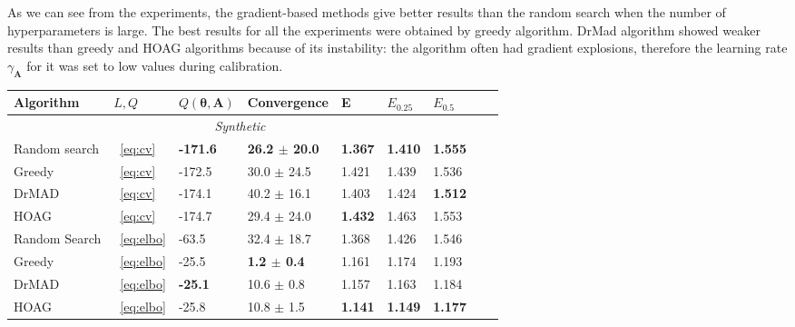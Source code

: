 \documentclass[smallextended]{svjour3}
\begin{document}
As we can see from the experiments, the gradient-based methods give better results than the random search when the number of hyperparameters is large. The best results for all the experiments were obtained by greedy algorithm. DrMad algorithm showed weaker results than greedy and HOAG algorithms because of its instability: the algorithm often had gradient explosions, therefore the learning rate $\gamma_{\mathbf{A}}$ for it was set to low values during calibration. 



\begin{table}
\footnotesize
\begin{tabularx}{\textwidth}{ |X|p{0.75cm}|X|X|p{1cm}|X|X|X|X|}

\hline
\textbf{Algorithm} & $L, Q$  & $Q(\boldsymbol{\theta}, \mathbf{A})$ & Convergence & E & $E_{0.25}$ & $E_{0.5}$\\ 
\hline
\multicolumn{7}{|c|}{\textit{Synthetic}}  \\
\hline
Random search & ~\eqref{eq:cv} & \bf -171.6  &\bf 26.2 $\pm$ 20.0  & \bf 1.367 &\bf 1.410 &\bf 1.555 \\
\hline
Greedy & ~\eqref{eq:cv} & -172.5 & 30.0 $\pm$ 24.5 & 1.421 & 1.439 &  1.536\\
\hline
DrMAD & ~\eqref{eq:cv} & -174.1 & 40.2 $\pm$ 16.1 &  1.403 & 1.424 & \bf 1.512 \\
\hline
HOAG & ~\eqref{eq:cv} &-174.7 & 29.4 $\pm$ 24.0 &   \bf 1.432  & 1.463 & 1.553\\
\hline
Random Search & ~\eqref{eq:elbo} & -63.5  & 32.4 $\pm$ 18.7  & 1.368 & 1.426 & 1.546  \\
\hline
Greedy & ~\eqref{eq:elbo} & -25.5 & \bf 1.2 $\pm$ 0.4 & 1.161 & 1.174 & 1.193\\
\hline
DrMAD & ~\eqref{eq:elbo} & \bf -25.1 &  10.6 $\pm$ 0.8 &  1.157 & 1.163 &  1.184\\
\hline
HOAG & ~\eqref{eq:elbo} &-25.8 & 10.8 $\pm$ 1.5&   \bf 1.141  & \bf 1.149 & \bf 1.177\\
\hline



\end{tabularx}
\end{table}
\end{document}
